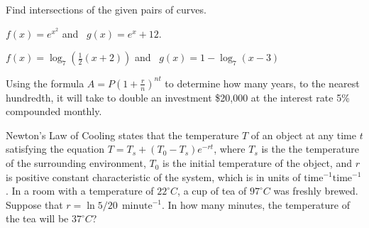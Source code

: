 \vfill
\begin{center} \hfill
\end{center}


\begin{exercise}
	Find intersections of the given pairs of curves.

	\begin{enumerate*}[label={(\arabic*)~}]
		\item $f(x)=e^{x^2}$ and~ $g(x)=e^x+12$.
		\item $f(x)=\log_7\left(\frac12(x+2)\right)$ and~ $g(x)=1-\log_7(x-3)$
		\hfill\null
	\end{enumerate*}
\end{exercise}
\vfill
\begin{center} \hfill
\end{center}

\newpage

\begin{exercise}
	Using the formula $A=P(1+\frac rn)^{nt}$ to determine how many years, to the nearest hundredth,  it will take to double an investment \$20,000 at the interest rate 5\% compounded monthly.
\end{exercise}

\vfill
\begin{center} \hfill
\end{center}


\begin{exercise}
Newton's Law of Cooling states that the temperature $T$ of an object at any time $t$ satisfying the equation $T=T_s+(T_0-T_s)e^{-rt}$,
where $T_s$ is the the temperature of the surrounding environment,
$T_0$ is the initial temperature of the object,
and $r$ is positive constant characteristic of the system,
which is in units of ${\displaystyle {\text{time}}^{-1}}{\displaystyle {\text{time}}^{-1}}$.
In a room with a temperature of $22 ^\circ C$, a cup of tea of $97 ^\circ C$ was freshly brewed. 
Suppose that $r=\ln 5/20~~\text{minute}^{-1} $. In how many minutes, the temperature of the tea will be $37 ^\circ C$?
\end{exercise}

